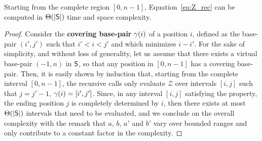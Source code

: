 \begin{theorem}Starting from the complete region $[0,n-1]$, Equation~\eqref{eq:Z_rec} can be computed in $\Theta(|\text{\sf S}|)$ time and space complexity.
\end{theorem}
\begin{proof}

Consider the {\bf covering base-pair} $\gamma(i)$ of a position $i$, defined as the base-pair $(i',j')$ such that $i'<i<j'$ and which minimizes $i-i'$. For the sake of simplicity, and without loss of generality, let us assume that there exists a virtual base-pair $(-1,n)$ in $\text{\sf S}$, so that any position in $[0,n-1]$ has a covering base-pair.
Then, it is easily shown by induction that, starting from the complete interval $[0,n-1]$, the recursive calls only evaluate $\mathcal{Z}$ over intervals $[i,j]$ such that $j=j'-1$, $\gamma(i)=[i',j']$. 
Since, in any interval $[i,j]$ satisfying the property, the ending position $j$ is completely determined by $i$, then there exists at most $\Theta(|\text{\sf S}|)$ intervals that need to be evaluated, and we conclude on the overall complexity with the remark that $a$, $b$, $a'$ and $b'$ vary over bounded ranges and only contribute to a constant factor in the complexity.
\end{proof}


